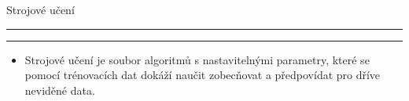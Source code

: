 \documentclass[aspectratio=43]{beamer}
\def\vs{\vspace{-2mm}}
\def\lend{\phantom{g}\vspace{1.5mm}\hrule\hrule}
\begin{document}
\begin{frame}{\vs Strojové učení \lend}
\vspace{-30mm}
\begin{itemize}
    \small
    \item[] Strojové učení je soubor algoritmů s nastavitelnými parametry, které se pomocí trénovacích dat dokáží naučit zobecňovat a předpovídat pro dříve neviděné data.
\end{itemize}
\end{frame}
\end{document}
